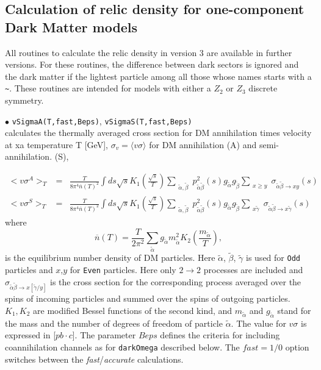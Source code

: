 \documentclass[12pt,a4paper]{article}
\begin{document}
  

\subsection{Calculation of relic density for one-component Dark Matter models}
\label{sec:one_component}
All routines to calculate the relic density in  version 3 are  available in further versions. For these routines,  the difference between 
 dark sectors is ignored and the dark matter if the lightest particle among all those whose names starts with a \verb|~|. These routines are intended for models with either a $Z_2$ or $Z_3$ discrete symmetry.
  
\noindent
$\bullet$ \verb|vSigmaA(T,fast,Beps)|,  \verb|vSigmaS(T,fast,Beps)|\\
calculates the thermally averaged cross section for DM annihilation  times velocity  
at xa  temperature T [GeV], $\sigma_v=\langle v\sigma \rangle$  for DM annihilation (A)  and semi-annihilation. (S), 

\begin{eqnarray}
\label{vSigmaA}
<v\sigma^A>_T &=& \frac{T}{8\pi^4  \overline{n}(T)^2} \int ds\sqrt{s} K_1\left(\frac{\sqrt{s}}{T}\right)   
\sum_{\substack{
\tilde\alpha ,\tilde\beta }}  p_{\tilde\alpha\tilde\beta}^2(s) g_{\tilde\alpha} g_{\tilde\beta} 
\sum_{\substack{ x \ge y }} {\sigma}_{\tilde\alpha\tilde\beta\to x y}(s)\\
\label{vSigmaS}
<v\sigma^S>_T &=& \frac{T}{8\pi^4  \overline{n}(T)^2} \int ds\sqrt{s} K_1\left(\frac{\sqrt{s}}{T}\right)   
\sum_{\substack{
\tilde\alpha ,\tilde\beta }}  p_{\tilde\alpha\tilde\beta}^2(s) g_{\tilde\alpha} g_{\tilde\beta} 
 \sum_{\substack{x  \tilde\gamma }}
 {\sigma}_{\tilde\alpha\tilde\beta\to x\tilde\gamma}(s)
\end{eqnarray}
where 
\begin{equation}
\label{nEqtot}
\overline{n}(T)=\frac{T}{2\pi^2 } \sum_{\tilde\alpha} g_{\tilde\alpha} m^2_{\tilde\alpha} K_2(\frac{m_{\tilde\alpha}}{T}),
\end{equation}
 is the equilibrium number density of DM particles.
Here  $\tilde\alpha$, $\tilde\beta$, $\tilde\gamma$  is used for  {\tt Odd} particles and $x$,$y$
for {\tt Even}  particles.  Here only $2\to 2$ processes are included and   ${\sigma}_{\tilde\alpha\tilde\beta\to x[\tilde\gamma/y]} $ is the cross section for the 
corresponding  process  averaged over the spins of incoming particles and summed
over the spins of outgoing particles.
 $K_1,K_2$ are modified Bessel functions of the second kind, and 
$m_{\tilde\alpha}$ and $g_{\tilde\alpha}$ stand for the  mass and the number of degrees of freedom of particle $\tilde\alpha$.
The value for $v\sigma$  is expressed in [$pb\cdot c$].  The parameter $Beps$ defines the criteria for including coannihilation
channels as for {\tt darkOmega} described below.
The $fast=1/0$ option switches between the {\it fast}/{\it accurate} calculations. 
\end{document}
